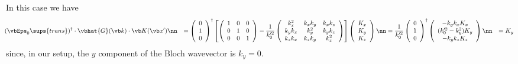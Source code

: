 \documentclass[letterpaper]{article}
\begin{document}
In this case we have 
\begin{align}
&\hspace{-0.05in}
 (\vbEps_0\sups{trans})^\dagger \cdot
 \vbhat{G}(\vb k) \cdot \vb K(\vb x^\prime)
\nn
&=
 \left(\begin{array}{c}0 \\ 1 \\ 0\end{array}\right)^\dagger
 \left[ \left(\begin{array}{ccc}
               1 & 0 & 0 \\ 
               0 & 1 & 0 \\ 
               0 & 0 & 1
              \end{array}\right)
       -\frac{1}{k_0^{\prime 2}}
        \left(\begin{array}{ccc}
               k_x^2   & k_x k_y & k_x k_z \\
               k_yk_x  & k_y^2   & k_y k_z \\
               k_z k_x & k_z k_y & k_z^2
              \end{array}
        \right)
 \right]
 \left(\begin{array}{c}K_x \\ K_y \\ K_z\end{array}\right)
\nn
&=
 \frac{1}{k_0^{\prime 2}}
 \left(\begin{array}{c}0 \\ 1 \\ 0\end{array}\right)^\dagger
 \left(\begin{array}{c} -k_y k_x K_x \\ (k_0^{\prime 2}-k_y^2)K_y \\ -k_y k_z K_z
       \end{array}\right)
\nn
&= K_y
\label{ECN1}
\end{align}
since, in our setup, the $y$ component of the Bloch 
wavevector is $k_y=0.$
\end{document}
